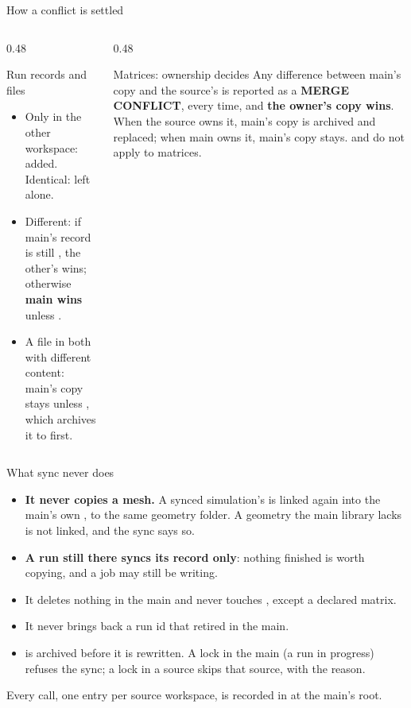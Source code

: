 \begin{frame}{How a conflict is settled}
\begin{columns}[T]
\begin{column}{0.48\textwidth}
\begin{block}{Run records and files}
\begin{itemize}\small
  \item Only in the other workspace: added. Identical: left alone.
  \item Different: if main's record is still , the other's
        wins; otherwise \textbf{main wins} unless .
  \item A file in both with different content: main's copy stays unless
        , which archives it to
         first.
\end{itemize}
\end{block}
\end{column}
\begin{column}{0.48\textwidth}
\begin{alertblock}{Matrices: ownership decides}
\small Any difference between main's copy and the source's is reported as a
\textbf{MERGE CONFLICT}, every time, and \textbf{the owner's copy wins}. When
the source owns it, main's copy is archived and replaced; when main owns it,
main's copy stays.  and  do not apply
to matrices.
\end{alertblock}
\end{column}
\end{columns}
\end{frame}

\begin{frame}{What sync never does}
\begin{itemize}\small
  \item \textbf{It never copies a mesh.} A synced simulation's 
        is linked again into the main's own , to the
        same geometry folder. A geometry the main library lacks is not
        linked, and the sync says so.
  \item \textbf{A run still  there syncs its record only}:
        nothing finished is worth copying, and a job may still be writing.
  \item It deletes nothing in the main and never touches ,
        except a declared matrix.
  \item It never brings back a run id that  retired in the
        main.
  \item {} is archived before it is rewritten. A lock in the
        main (a run in progress) refuses the sync; a lock in a source skips
        that source, with the reason.
\end{itemize}
\begin{takeaway}Every call, one entry per source workspace, is recorded in
 at the main's root.\end{takeaway}
\end{frame}

